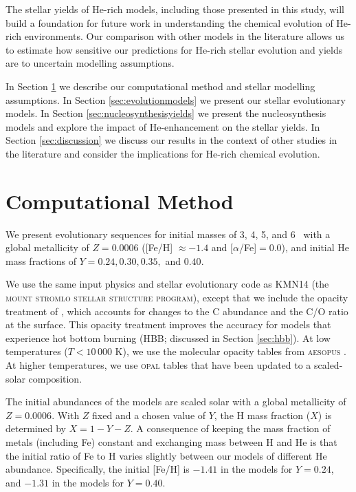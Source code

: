 The stellar yields of He-rich models, including those presented in this study, will build a foundation for future work in understanding the chemical evolution of He-rich environments. Our comparison with other models in the literature allows us to estimate how sensitive our predictions for He-rich stellar evolution and yields are to uncertain modelling assumptions.

In Section \ref{sec:method} we describe our computational method and stellar modelling assumptions. In Section \ref{sec:evolutionmodels} we present our stellar evolutionary models. In Section \ref{sec:nucleosynthesisyields} we present the nucleosynthesis models and explore the impact of He-enhancement on the stellar yields. In Section \ref{sec:discussion} we discuss our results in the context of other studies in the literature and consider the implications for He-rich chemical evolution.

\section{Computational Method}\label{sec:method}
We present evolutionary sequences for initial masses of 3, 4, 5, and 6 \Msun\ with a global metallicity of $Z=0.0006$ ([Fe/H] $\approx-1.4$ and [$\alpha$/Fe]$=0.0$), and initial He mass fractions of $Y=0.24, 0.30, 0.35,$ and $0.40$.

We use the same input physics and stellar evolutionary code as KMN14 (the \textsc{mount stromlo stellar structure program}), except that we include the opacity treatment of \citet{Fishlock:2014hn}, which accounts for changes to the C abundance and the C/O ratio at the surface. This opacity treatment improves the accuracy for models that experience hot bottom burning (HBB; discussed in Section \ref{sec:hbb}). At low temperatures ($T < 10\,000$ K), we use the molecular opacity tables from \textsc{aesopus} \citep{Marigo:2009gz}. At higher temperatures, we use \textsc{opal} tables \citep{Iglesias:1996dp} that have been updated to a \citet{Lodders:2003bf} scaled-solar composition.

The initial abundances of the models are scaled solar \citep{Asplund:2009eu} with a global metallicity of $Z=0.0006$. With $Z$ fixed and a chosen value of $Y$, the H mass fraction ($X$) is determined by $X=1-Y-Z$. A consequence of keeping the mass fraction of metals (including Fe) constant and exchanging mass between H and He is that the initial ratio of Fe to H varies slightly between our models of different He abundance. Specifically, the initial [Fe/H] is $-1.41$ in the models for $Y=0.24$, and $-1.31$ in the models for $Y=0.40$.

